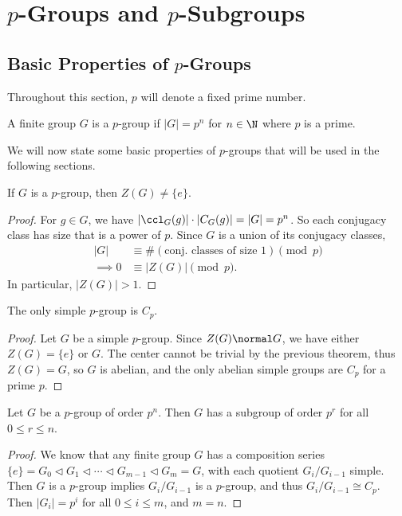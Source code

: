 \section{$p$-Groups and $p$-Subgroups}

\subsection{Basic Properties of $p$-Groups}

Throughout this section, $p$ will denote a fixed prime number.

\begin{definition}[$p$-group]
	A finite group $G$ is a $p$-group if $|G| = p^n$ for $n \in \N$ where $p$ is a prime.
\end{definition}


We will now state some basic properties of $p$-groups that will be used in the following sections.

\begin{theorem}
	If $G$ is a $p$-group, then $Z(G) \neq \{e\}$.
\end{theorem}
\begin{proof}
	For $g \in G$, we have $|\ccl_G(g)| \cdot |C_G(g)| = |G| = p^n$. So each conjugacy class has size that is a power of $p$. 
	Since $G$ is a union of its conjugacy classes, 
	\begin{align*}
		|G| &\equiv \#(\text{conj. classes of size 1}) \pmod{p}  \\
\implies 0 &\equiv |Z(G)| \pmod{p}.
	\end{align*}
	In particular, $|Z(G)| > 1$.
\end{proof}

\begin{corollary}
	The only simple $p$-group is $C_p$.
\end{corollary}
\begin{proof}
	Let $G$ be a simple $p$-group. Since $Z(G) \normal G$, we have either $Z(G) = \{e\}$ or $G$. The center cannot be trivial by the previous theorem, thus $Z(G) = G$, so $G$ is abelian, and the only abelian simple groups are $C_p$ for a prime $p$.
\end{proof}

\begin{corollary}
	Let $G$ be a $p$-group of order $p^n$. Then $G$ has a subgroup of order $p^r$ for all $0 \leq r \leq n$.
\end{corollary}
\begin{proof}
	We know that any finite group $G$ has a composition series $\{e\} = G_0 \triangleleft G_1 \triangleleft \cdots \triangleleft G_{m - 1} \triangleleft G_m = G$, with each quotient $G_i / G_{i - 1}$ simple. Then $G$ is a $p$-group implies $G_i/G_{i - 1}$ is a $p$-group, and thus $G_i/G_{i - 1} \cong C_p$. Then $|G_i| = p^i$ for all $0 \leq i \leq m$, and $m = n$.
\end{proof}

